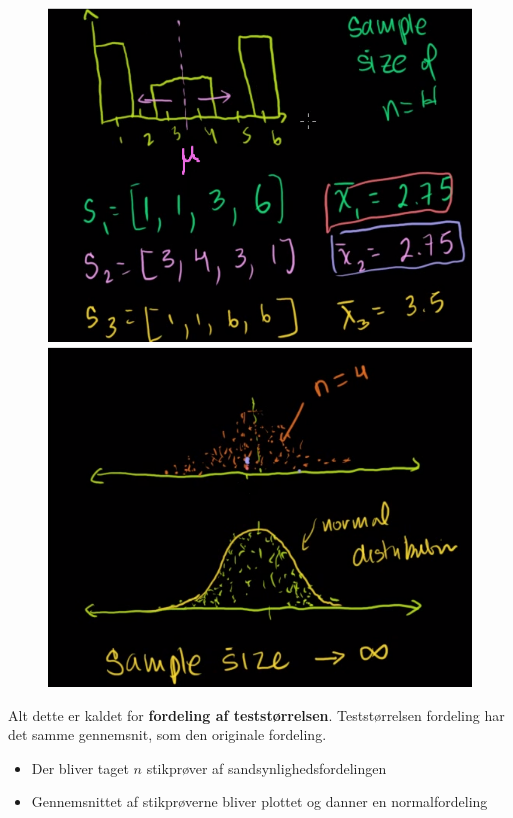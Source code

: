 \documentclass[11pt]{article}
\begin{document}
\begin{figure}[H]
\centering
\includegraphics[scale=0.5]{img/Selection_005}
\includegraphics[scale=0.5]{img/Selection_006}
\end{figure}
Alt dette er kaldet for \textbf{fordeling af teststørrelsen}. Teststørrelsen fordeling har det samme gennemsnit, som den originale fordeling.
\begin{itemize}\itemsep-2pt
\item Der bliver taget $n$ stikprøver af sandsynlighedsfordelingen
\item Gennemsnittet af stikprøverne bliver plottet og danner en normalfordeling
\end{itemize}
\end{document}
